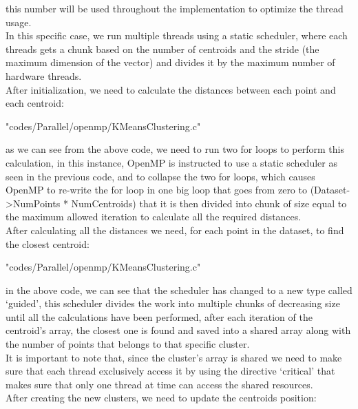 \documentclass[10pt,twocolumn,letterpaper]{article}
\begin{document}
this number will be used throughout the implementation to optimize the thread usage.\\
In this specific case, we run multiple threads using a static scheduler, where each threads gets a chunk based on the number of 
centroids and the stride (the maximum dimension of the vector) and divides it by the maximum number of hardware threads.\\
After initialization, we need to calculate the distances between each point and each centroid:\\

\begin{lstinputlisting}[language=C,style=CSnippetStyle,caption=OpenMP Distance Calculation,firstline=29,lastline=41]
					   {"codes/Parallel/openmp/KMeansClustering.c"}
\end{lstinputlisting}
as we can see from the above code, we need to run two for loops to perform this calculation, in this instance, OpenMP is instructed to use a static scheduler as seen in the previous code, and to collapse the two for loops, which causes OpenMP to
re-write the for loop in one big loop that goes from zero to (Dataset->NumPoints * NumCentroids) that it is then divided into
chunk of size equal to the maximum allowed iteration to calculate all the required distances.\\
After calculating all the distances we need, for each point in the dataset, to find the closest centroid:\\
\begin{lstinputlisting}[language=C,style=CSnippetStyle,caption=OpenMP Nearest Centroid Calculation,firstline=45,lastline=60]
					   {"codes/Parallel/openmp/KMeansClustering.c"}
\end{lstinputlisting}
in the above code, we can see that the scheduler has changed to a new type called `guided', this scheduler divides the work 
into multiple chunks of decreasing size until all the calculations have been performed, after each iteration of the centroid's
array, the closest one is found and saved into a shared array along with the number of points that belongs to that specific 
cluster.\\
It is important to note that, since the cluster's array is shared we need to make sure that each thread exclusively access it 
by using the directive `critical' that makes sure that only one thread at time can access the shared resources.\\
After creating the new clusters, we need to update the centroids position:\\
\end{document}
